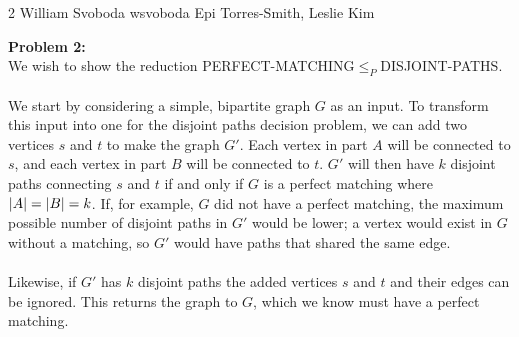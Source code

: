 \documentclass[12pt,letterpaper]{cos340hw}
\begin{document}
           {2}            %
           {William Svoboda}  %
           {wsvoboda}   %
           {Epi Torres-Smith, Leslie Kim} 




\noindent\textbf{Problem 2:}\\
We wish to show the reduction PERFECT-MATCHING$\le_P$DISJOINT-PATHS.\\\\
We start by considering a simple, bipartite graph $G$ as an input. To transform this input into one for 
the disjoint paths decision problem, we can add two vertices $s$ and $t$ to make the graph $G'$. Each 
vertex in part $A$ will be connected to $s$, and each vertex in part $B$ will be connected to $t$. $G'$ will 
then have $k$ disjoint paths connecting $s$ and $t$ if and only if $G$ is a perfect matching where
$\left| A \right|=\left| B \right|=k$. If, for example, $G$ did not have a perfect matching, the maximum possible number 
of disjoint paths in $G'$ would be lower; a vertex would exist in $G$ without a matching, so $G'$ would 
have paths that shared the same edge.\\\\
Likewise, if $G'$ has $k$ disjoint paths the added vertices $s$ and $t$ and their edges can be ignored. 
This returns the graph to $G$, which we know must have a perfect matching.
 

\end{document}
